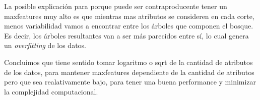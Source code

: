 La posible explicación para porque puede ser contraproducente tener un maxfeatures muy alto es que mientras mas atributos se consideren en cada corte, menos variabilidad vamos a encontrar entre los árboles que componen el bosque. Es decir, los árboles resultantes van a ser más parecidos entre sí, lo cual genera un \textit{overfitting} de los datos.  

Concluimos que tiene sentido tomar logaritmo o sqrt de la cantidad de atributos de los datos, para mantener maxfeatures dependiente de la cantidad de atributos pero que sea realativamente bajo, para tener una buena performance y minimizar la complejidad computacional. 
